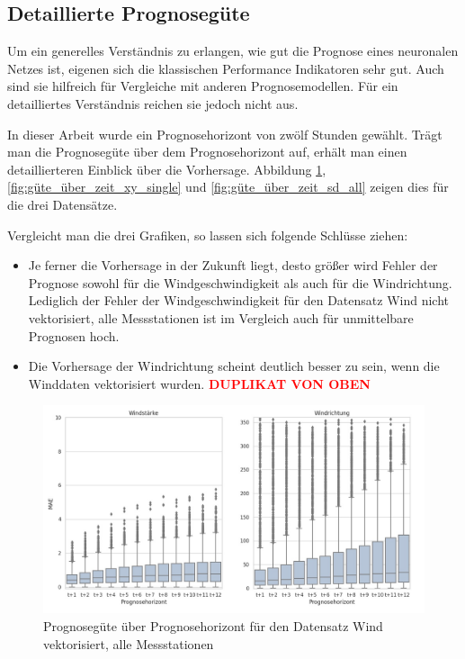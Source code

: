 \documentclass[
12pt, %
toc=listofnumbered, %
toc=chapterentrydotfill, %
numbers=noenddot, %
captions=tableheading, %
bibliography=numbered
]{scrreprt}
\let\Oldsubsection\subsection
\renewcommand{\subsection}{\FloatBarrier\Oldsubsection}
\newcommand{\qm}[1]{\glqq#1\grqq{}} %
\newcommand{\highlight}[1]{\textbf{\textcolor{red}{#1}}}
\begin{document}
\subsection{Detaillierte Prognosegüte}
Um ein generelles Verständnis zu erlangen, wie gut die Prognose eines neuronalen Netzes ist, eigenen sich die klassischen Performance Indikatoren sehr gut. Auch sind sie hilfreich für Vergleiche mit anderen Prognosemodellen. 
Für ein detailliertes Verständnis reichen sie jedoch nicht aus. 

In dieser Arbeit wurde ein Prognosehorizont von zwölf Stunden gewählt. Trägt man die Prognosegüte über dem Prognosehorizont auf, erhält man einen detaillierteren Einblick über die Vorhersage. Abbildung \ref{fig:güte_über_zeit_xy_all},  \ref{fig:güte_über_zeit_xy_single} und  \ref{fig:güte_über_zeit_sd_all} zeigen dies für die drei Datensätze.

Vergleicht man die drei Grafiken, so lassen sich folgende Schlüsse ziehen:

\begin{itemize}
	\item Je ferner die Vorhersage in der Zukunft liegt, desto größer wird Fehler der Prognose sowohl für die Windgeschwindigkeit als auch für die Windrichtung. Lediglich der Fehler der Windgeschwindigkeit für den Datensatz \qm{Wind nicht vektorisiert, alle Messstationen} ist im Vergleich auch für unmittelbare Prognosen hoch.
	\item Die Vorhersage der Windrichtung scheint deutlich besser zu sein, wenn die Winddaten vektorisiert wurden. \highlight{DUPLIKAT VON OBEN}
\end{itemize}

\begin{figure}[tph]
	\begin{center}
		\includegraphics[width=\linewidth]{./images/Güte über Prognosehorizont sd via xy-cropped.jpg}
		\caption{Prognosegüte über Prognosehorizont für den Datensatz \qm{Wind vektorisiert, alle Messstationen}}
		\label{fig:güte_über_zeit_xy_all}
	\end{center}
\end{figure}
\end{document}
